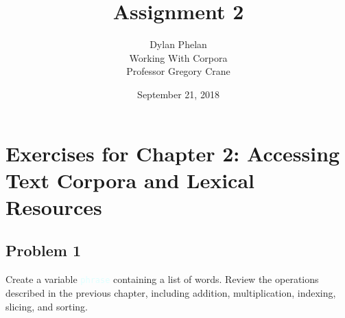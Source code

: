 \documentclass[11pt]{article}
\author{ 
	Dylan Phelan \\ 
	Working With Corpora \\ 
	Professor Gregory Crane 
}
\title{Assignment 2}
\date{September 21, 2018}
\newcommand{\codeword}[1]{
	\texttt{\textcolor{lightCyan}{#1}}
}
\begin{document}
\maketitle

\section*{Exercises for Chapter 2: Accessing Text Corpora and Lexical Resources}
\subsection*{Problem 1}

Create a variable \codeword{phrase} containing a list of words. Review the operations described in the previous chapter, including addition, multiplication, indexing, slicing, and sorting.
\end{document}
